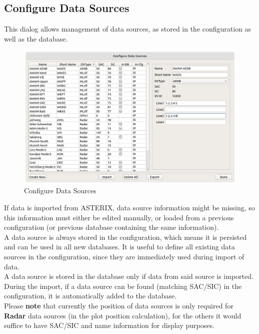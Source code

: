 \subsection{Configure Data Sources}
\label{sec:ui_configure_data_sources}

This dialog allows management of data sources, as stored in the configuration as well as the database. \\

\begin{figure}[H]
    \hspace*{-2cm}
    \includegraphics[width=18cm]{figures/configure_data_sources.png}
  \caption{Configure Data Sources}
\end{figure}

If data is imported from ASTERIX, data source information might be missing, so this information must either be edited manually, or loaded from a previous configuration (or previous database containing the same information). \\

A data source is always stored in the configuration, which means it is persisted and can be used in all new databases. It is useful to define all existing data sources in the configuration, since they are immediately used during import of data. \\

A data source is stored in the database only if data from said source is imported. During the import, if a data source can be found (matching SAC/SIC) in the configuration, it is automatically added to the database. \\

Please \textbf{note} that currently the position of data sources is only required for \textbf{Radar} data sources (in the plot position calculation), for the others it would suffice to have SAC/SIC and name information for display purposes.

